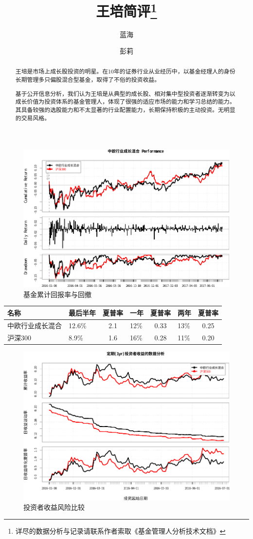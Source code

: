 \documentclass[journal=jacsat,manuscript=article]{achemso}
\author{蓝海}
\author{彭莉}
\title[王培]{王培简评\footnote{详尽的数据分析与记录请联系作者索取《基金管理人分析技术文档》}}
\begin{document}
\begin{abstract}
王培是市场上成长股投资的明星。在10年的证券行业从业经历中，以基金经理人的身份长期管理多只偏股混合型基金，取得了不俗的投资收益。

基于公开信息分析，我们认为王培是从典型的成长股、相对集中型投资者逐渐转变为以成长价值为投资体系的基金管理人，体现了很强的适应市场的能力和学习总结的能力。其具备较强的选股能力和不太显著的行业配置能力，长期保持积极的主动投资。无明显的交易风格。
\end{abstract}
\begin{figure}[htbp]
\centering
\includegraphics{wp-review_files/figure-latex/unnamed-chunk-2-1.pdf}
\caption{基金累计回报率与回撤}
\end{figure}

\begin{longtable}[]{@{}llclclc@{}}
\toprule
名称 & 最后半年 & 夏普率 & 一年 & 夏普率 & 两年 & 夏普率\tabularnewline
\midrule
\endhead
中欧行业成长混合 & 12.6\% & 2.1 & 12\% & 0.33 & 13\% &
0.25\tabularnewline
沪深300 & 8.9\% & 1.6 & 16\% & 0.28 & 11\% & 0.20\tabularnewline
\bottomrule
\end{longtable}

\begin{figure}[htbp]
\centering
\includegraphics{wp-review_files/figure-latex/unnamed-chunk-3-1.pdf}
\caption{投资者收益风险比较}
\end{figure}
\end{document}
